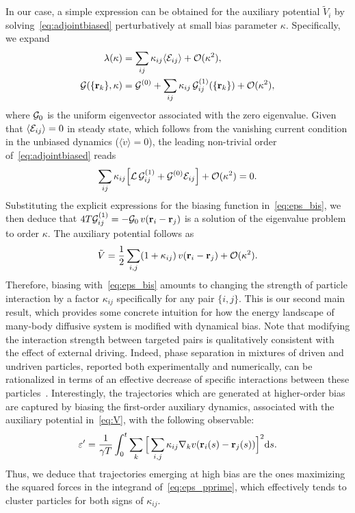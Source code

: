 \documentclass[superscriptaddress, twocolumn, prx, longbibliography, nofootinbib]{revtex4-1}
\begin{document}
In our case, a simple expression can be obtained for the auxiliary potential $\tilde V_i$ by solving~\eqref{eq:adjointbiased} perturbatively at small bias parameter $\kappa$. Specifically, we expand
\begin{equation}
	\begin{aligned}
		\lambda(\kappa) &= \sum_{ij} \kappa_{ij} \langle{\cal E}_{ij}\rangle + {\cal O}(\kappa^2) ,
		\\
		{\cal G}(\{{\bf r}_k\},\kappa) &= {\cal G}^{(0)} + \sum_{ij}\kappa_{ij}\,{\cal G}^{(1)}_{ij}(\{{\bf r}_k\}) + {\cal O}(\kappa^2) ,
	\end{aligned}
\end{equation}
where ${\cal G}_0$ is the uniform eigenvector associated with the zero eigenvalue. Given that $\langle{\cal E}_{ij}\rangle=0$ in steady state,  which follows from the vanishing current condition in the unbiased dynamics ($\langle\dot v\rangle=0$), the leading non-trivial order of~\eqref{eq:adjointbiased} reads
\begin{equation}\label{eq:eigenvalue}
	\sum_{ij} \kappa_{ij} \Big[ {\cal L}\, {\cal G}^{(1)}_{ij} + {\cal G}^{(0)} {\cal E}_{ij} \Big] + {\cal O}(\kappa^2) = 0 .
\end{equation}
Substituting the explicit expressions for the biasing function in~\eqref{eq:eps_bis}, we then deduce that $4T{\cal G}^{(1)}_{ij} = -{\cal G}_0\,v({\bf r}_i-{\bf r}_j)$ is a solution of the eigenvalue problem to order $\kappa$. The auxiliary potential follows as
\begin{equation}\label{eq:V}
	\tilde V = \frac{1}{2}\sum_{i,j} (1+\kappa_{ij})\, v({\bf r}_i-{\bf r}_j) + {\cal O}(\kappa^2) .
\end{equation}
Therefore, biasing with~\eqref{eq:eps_bis} amounts to changing the strength of particle interaction by a factor $\kappa_{ij}$ specifically for any pair $\{i,j\}$. This is our second main result, which provides some concrete intuition for how the energy landscape of many-body diffusive system is modified with dynamical bias. Note that modifying the interaction strength between targeted pairs is qualitatively consistent with the effect of external driving. Indeed, phase separation in mixtures of driven and undriven particles, reported both experimentally and numerically, can be rationalized in terms of an effective decrease of specific interactions between these particles~\cite{delJunco2018, Han2016}. Interestingly, the trajectories which are generated at higher-order bias are captured by biasing the first-order auxiliary dynamics, associated with the auxiliary potential in~\eqref{eq:V}, with the following observable:
\begin{equation}\label{eq:eps_pprime}
	\varepsilon' = \frac{1}{\gamma T}\int_0^t\sum_k\Big[\sum_{i,j}\kappa_{ij} \nabla_kv({\bf r}_i(s)-{\bf r}_j(s))\Big]^2{\rm d}s .
\end{equation}
Thus, we deduce that trajectories emerging at high bias are the ones maximizing the squared forces in the integrand of~\eqref{eq:eps_pprime}, which effectively tends to cluster particles for both signs of $\kappa_{ij}$.
\end{document}
